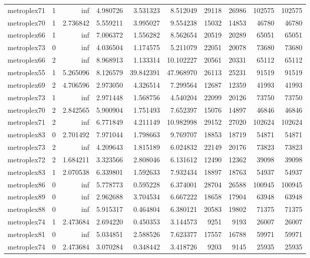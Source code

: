 \begin{longtable}{|l|r|r|r|r|r|r|r|r|r|}
metroplex71 & 1 & inf & 4.980726 & 3.531323 & 8.512049 & 29118 & 26986 & 102575 & 102575 \\
metroplex70 & 1 & 2.736842 & 5.559211 & 3.995027 & 9.554238 & 15032 & 14853 & 46780 & 46780 \\
metroplex66 & 1 & inf & 7.006372 & 1.556282 & 8.562654 & 20519 & 20289 & 65051 & 65051 \\
metroplex73 & 0 & inf & 4.036504 & 1.174575 & 5.211079 & 22051 & 20078 & 73680 & 73680 \\
metroplex66 & 2 & inf & 8.968913 & 1.133314 & 10.102227 & 20561 & 20331 & 65112 & 65112 \\
metroplex55 & 1 & 5.265096 & 8.126579 & 39.842391 & 47.968970 & 26113 & 25231 & 91519 & 91519 \\
metroplex69 & 2 & 4.706596 & 2.973050 & 4.326514 & 7.299564 & 12687 & 12359 & 41993 & 41993 \\
metroplex73 & 1 & inf & 2.971448 & 1.568756 & 4.540204 & 22099 & 20126 & 73750 & 73750 \\
metroplex70 & 2 & 2.842565 & 5.900904 & 1.751493 & 7.652397 & 15076 & 14897 & 46846 & 46846 \\
metroplex71 & 2 & inf & 6.771849 & 4.211149 & 10.982998 & 29152 & 27020 & 102624 & 102624 \\
metroplex83 & 0 & 2.701492 & 7.971044 & 1.798663 & 9.769707 & 18853 & 18719 & 54871 & 54871 \\
metroplex73 & 2 & inf & 4.209643 & 1.815189 & 6.024832 & 22149 & 20176 & 73823 & 73823 \\
metroplex72 & 2 & 1.684211 & 3.323566 & 2.808046 & 6.131612 & 12490 & 12362 & 39098 & 39098 \\
metroplex83 & 1 & 2.070538 & 6.339801 & 1.592633 & 7.932434 & 18897 & 18763 & 54937 & 54937 \\
metroplex86 & 0 & inf & 5.778773 & 0.595228 & 6.374001 & 28704 & 26588 & 100945 & 100945 \\
metroplex89 & 0 & inf & 2.962688 & 3.704534 & 6.667222 & 18658 & 17904 & 63948 & 63948 \\
metroplex88 & 0 & inf & 5.915317 & 0.464804 & 6.380121 & 20583 & 19802 & 71375 & 71375 \\
metroplex74 & 1 & 2.473684 & 2.694220 & 0.450353 & 3.144573 & 9251 & 9193 & 26007 & 26007 \\
metroplex81 & 0 & inf & 5.034851 & 2.588526 & 7.623377 & 17557 & 16788 & 59971 & 59971 \\
metroplex74 & 0 & 2.473684 & 3.070284 & 0.348442 & 3.418726 & 9203 & 9145 & 25935 & 25935 \\

\end{longtable}
